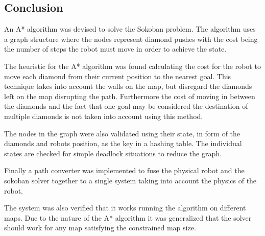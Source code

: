 \subsection{Conclusion}
An A* algorithm was devised to solve the Sokoban problem.
The algorithm uses a graph structure where the nodes represent diamond pushes with the cost being the number of steps the robot must move in order to achieve the state.

The heuristic for the A* algorithm was found calculating the cost for the robot to move each diamond from their current position to the nearest goal.
This technique takes into account the walls on the map, but disregard the diamonds left on the map disrupting the path.
Furthermore the cost of moving in between the diamonds and the fact that one goal may be considered the destination of multiple diamonds is not taken into account using this method.

The nodes in the graph were also validated using their state, in form of the diamonds and robots position, as the key in a hashing table.
The individual states are checked for simple deadlock situations to reduce the graph.

Finally a path converter was implemented to fuse the physical robot and the sokoban solver together to a single system taking into account the physics of the robot.

The system was also verified that it works running the algorithm on different maps.
Due to the nature of the A* algorithm it was generalized that the solver should work for any map satisfying the constrained map size.



